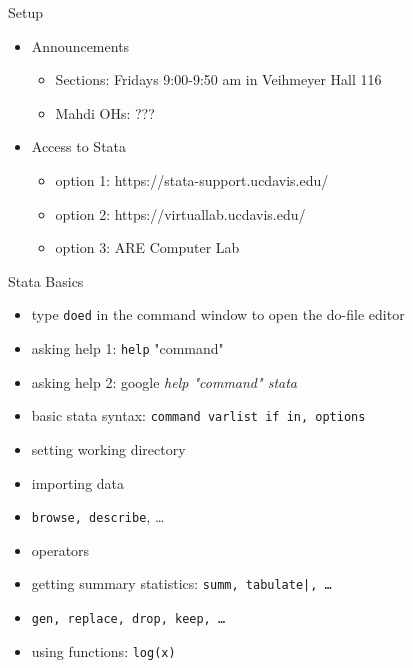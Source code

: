 \documentclass{beamer}
\begin{document}
\begin{frame}{Setup}
\begin{itemize}
\item Announcements
\begin{itemize}
\item Sections: Fridays 9:00-9:50 am in Veihmeyer Hall 116
\item Mahdi OHs: ???  
\end{itemize}
\item Access to Stata
\begin{itemize}
\item option 1: https://stata-support.ucdavis.edu/
\item option 2: https://virtuallab.ucdavis.edu/
\item option 3: ARE Computer Lab
\end{itemize}

\end{itemize}
\end{frame}

\begin{frame}{Stata Basics}

\begin{itemize}
\item type \texttt{doed} in the command window to open the do-file editor
\item asking help 1: \texttt{help} "command"
\item asking help 2: google \emph{help "command" stata}
\item basic stata syntax: \texttt{command varlist if in, options}
\end{itemize}
        
\begin{itemize}
\item setting working directory
\item importing data
\item \texttt{browse, describe}, \dots
\item operators
\item getting summary statistics: \texttt{summ, tabulate|, \dots}
\item \texttt{gen, replace, drop, keep, \dots}
\item using functions: \texttt{log(x)}
\end{itemize}

\end{frame}
\end{document}
